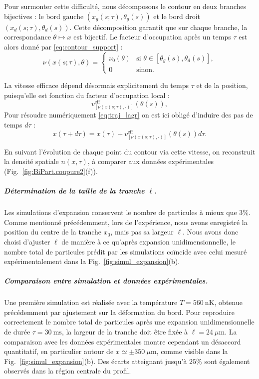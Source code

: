 Pour surmonter cette difficulté, nous décomposons le contour en deux branches bijectives : le bord gauche \((x_g(s;\tau), \theta_g(s))\) et le bord droit \((x_d(s;\tau), \theta_d(s))\). Cette décomposition garantit que sur chaque branche, la correspondance \(\theta \mapsto x\) est bijectif. Le facteur d’occupation après un temps \(\tau\) est alors donné par \eqref{eq:contour_support} :
\begin{equation}
\label{eq:contour_exp}
\nu ( x(s;\tau), \theta ) = 
\begin{cases}
\nu_0(\theta) & \text{si } \theta \in [\theta_g(s), \theta_d(s)], \\
0 & \text{sinon}.
\end{cases}
\end{equation}

La vitesse efficace dépend désormais explicitement du temps $\tau$ et de la position, puisqu’elle est fonction du facteur d’occupation local :
\[
v^{\mathrm{eff}}_{[\nu(x(s;\tau),\cdot)]}(\theta(s)),
\]
Pour résoudre numériquement \eqref{eq:traj_lagr} on est ici obligé d'induire des pas de temps $d\tau$ : 
\[
	x(\tau +d\tau ) = x(\tau ) + v^{\mathrm{eff}}_{[\nu(x(s;\tau),\cdot)]} (\theta(s))d \tau.
\]

En suivant l’évolution de chaque point du contour via cette vitesse, on reconstruit la densité spatiale \(n(x,\tau)\), à comparer aux données expérimentales (Fig.~\ref{fig:BiPart.coupure2}(f)).

\medskip

\subparagraph{Détermination de la taille de la tranche \(\ell\).}

Les simulations d’expansion conservent le nombre de particules à mieux que \(3\%\). Comme mentionné précédemment, lors de l’expérience, nous avons enregistré la position du centre de la tranche \(x_0\), mais pas sa largeur \(\ell\).  
Nous avons donc choisi d’ajuster \(\ell\) de manière à ce qu’après expansion unidimensionnelle, le nombre total de particules prédit par les simulations coïncide avec celui mesuré expérimentalement dans la Fig.~\ref{fig:simul_expansion}(b).

\medskip

\subparagraph{Comparaison entre simulation et données expérimentales.}

Une première simulation est réalisée avec la température \(T = 560~\mathrm{nK}\), obtenue précédemment par ajustement sur la déformation du bord.  
Pour reproduire correctement le nombre total de particules après une expansion unidimensionnelle de durée \(\tau = 30~\mathrm{ms}\), la largeur de la tranche doit être fixée à \(\ell = 24~\mu\mathrm{m}\).  
La comparaison avec les données expérimentales montre cependant un désaccord quantitatif, en particulier autour de \(x \simeq \pm 350~\mu\mathrm{m}\), comme visible dans la Fig.~\ref{fig:simul_expansion}(b). Des écarts atteignant jusqu’à \(25\%\) sont également observés dans la région centrale du profil.

